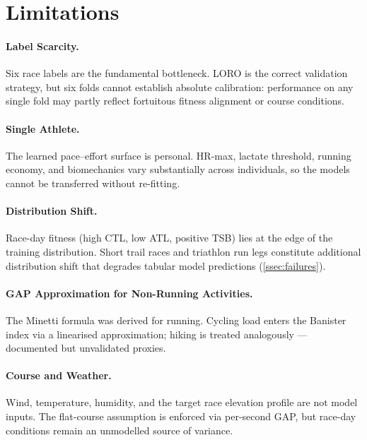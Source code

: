 \documentclass[11pt, a4paper]{article}
\begin{document}
\section{Limitations}
\label{sec:limitations}

\paragraph{Label Scarcity.}
Six race labels are the fundamental bottleneck.
LORO is the correct validation strategy, but six folds cannot establish
absolute calibration: performance on any single fold may partly reflect
fortuitous fitness alignment or course conditions.

\paragraph{Single Athlete.}
The learned pace--effort surface is personal.
HR-max, lactate threshold, running economy, and biomechanics vary substantially
across individuals, so the models cannot be transferred without re-fitting.

\paragraph{Distribution Shift.}
Race-day fitness (high CTL, low ATL, positive TSB) lies at the edge of the
training distribution.
Short trail races and triathlon run legs constitute additional distribution
shift that degrades tabular model predictions (\cref{ssec:failures}).

\paragraph{GAP Approximation for Non-Running Activities.}
The Minetti formula was derived for running.
Cycling load enters the Banister index via a linearised approximation;
hiking is treated analogously --- documented but unvalidated proxies.

\paragraph{Course and Weather.}
Wind, temperature, humidity, and the target race elevation profile are not
model inputs.
The flat-course assumption is enforced via per-second GAP, but race-day
conditions remain an unmodelled source of variance.
\end{document}
